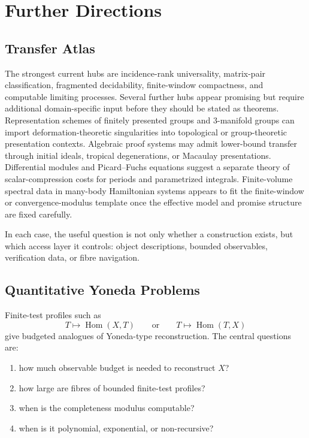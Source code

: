 \documentclass[11pt]{article}
\DeclareMathOperator{\Hom}{Hom}
\begin{document}
\section{Further Directions}

\subsection{Transfer Atlas}

The strongest current hubs are incidence-rank universality, matrix-pair classification, fragmented decidability, finite-window compactness, and computable limiting processes. Several further hubs appear promising but require additional domain-specific input before they should be stated as theorems. Representation schemes of finitely presented groups and \(3\)-manifold groups can import deformation-theoretic singularities into topological or group-theoretic presentation contexts. Algebraic proof systems may admit lower-bound transfer through initial ideals, tropical degenerations, or Macaulay presentations. Differential modules and Picard--Fuchs equations suggest a separate theory of scalar-compression costs for periods and parametrized integrals. Finite-volume spectral data in many-body Hamiltonian systems appears to fit the finite-window or convergence-modulus template once the effective model and promise structure are fixed carefully.

In each case, the useful question is not only whether a construction exists, but which access layer it controls: object descriptions, bounded observables, verification data, or fibre navigation.

\subsection{Quantitative Yoneda Problems}

Finite-test profiles such as
\[
T\mapsto \Hom(X,T)
\qquad\text{or}\qquad
T\mapsto \Hom(T,X)
\]
give budgeted analogues of Yoneda-type reconstruction. The central questions are:
\begin{enumerate}[label=(\roman*)]
\item how much observable budget is needed to reconstruct \(X\)?
\item how large are fibres of bounded finite-test profiles?
\item when is the completeness modulus computable?
\item when is it polynomial, exponential, or non-recursive?
\end{enumerate}
\end{document}
